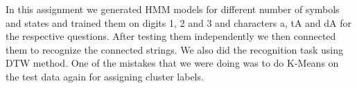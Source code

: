In this assignment we generated HMM models for different number of symbols and states and trained them on digits 1, 2 and 3 and characters a, tA and dA for the respective questions. After testing them independently we then connected them to recognize the connected strings. We also did the recognition task using DTW method. One of the mistakes that we were doing was to do K-Means on the test data again for assigning cluster labels.